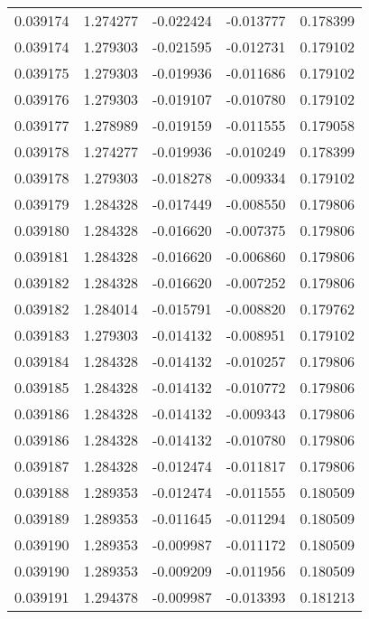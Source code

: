\begin{tabular}{lrrrr}
0.039174    &  1.274277 & -0.022424 & -0.013777 &             0.178399 \\
0.039174    &  1.279303 & -0.021595 & -0.012731 &             0.179102 \\
0.039175    &  1.279303 & -0.019936 & -0.011686 &             0.179102 \\
0.039176    &  1.279303 & -0.019107 & -0.010780 &             0.179102 \\
0.039177    &  1.278989 & -0.019159 & -0.011555 &             0.179058 \\
0.039178    &  1.274277 & -0.019936 & -0.010249 &             0.178399 \\
0.039178    &  1.279303 & -0.018278 & -0.009334 &             0.179102 \\
0.039179    &  1.284328 & -0.017449 & -0.008550 &             0.179806 \\
0.039180    &  1.284328 & -0.016620 & -0.007375 &             0.179806 \\
0.039181    &  1.284328 & -0.016620 & -0.006860 &             0.179806 \\
0.039182    &  1.284328 & -0.016620 & -0.007252 &             0.179806 \\
0.039182    &  1.284014 & -0.015791 & -0.008820 &             0.179762 \\
0.039183    &  1.279303 & -0.014132 & -0.008951 &             0.179102 \\
0.039184    &  1.284328 & -0.014132 & -0.010257 &             0.179806 \\
0.039185    &  1.284328 & -0.014132 & -0.010772 &             0.179806 \\
0.039186    &  1.284328 & -0.014132 & -0.009343 &             0.179806 \\
0.039186    &  1.284328 & -0.014132 & -0.010780 &             0.179806 \\
0.039187    &  1.284328 & -0.012474 & -0.011817 &             0.179806 \\
0.039188    &  1.289353 & -0.012474 & -0.011555 &             0.180509 \\
0.039189    &  1.289353 & -0.011645 & -0.011294 &             0.180509 \\
0.039190    &  1.289353 & -0.009987 & -0.011172 &             0.180509 \\
0.039190    &  1.289353 & -0.009209 & -0.011956 &             0.180509 \\
0.039191    &  1.294378 & -0.009987 & -0.013393 &             0.181213 \\

\end{tabular}
